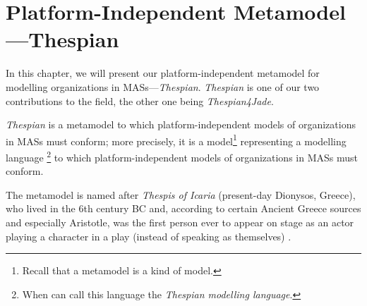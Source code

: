 
\chapter{Platform-Independent Metamodel---Thespian}

In this chapter, we will present our platform-independent metamodel for modelling organizations in MASs---\textit{Thespian}.
\textit{Thespian} is one of our two contributions to the field, the other one being \textit{Thespian4Jade}.

\textit{Thespian} is a metamodel to which platform-independent models of organizations in MASs must conform; more precisely, it is a model\footnote{Recall that a metamodel is a kind of model.} representing a modelling language \footnote{When can call this language the \textit{Thespian modelling language}.} to which platform-independent models of organizations in MASs must conform.

The metamodel is named after \textit{Thespis of Icaria} (present-day Dionysos, Greece), who lived in the 6th century BC and, according to certain Ancient Greece sources and especially Aristotle, was the first person ever to appear on stage as an actor playing a character in a play (instead of speaking as themselves) \cite{Wikipedia-Thespis}.

